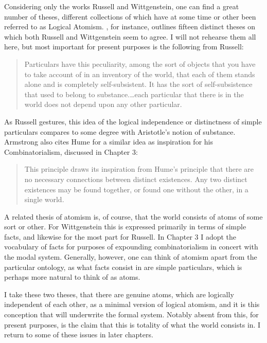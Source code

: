 Considering only the works Russell and Wittgenstein, one can find a great number of theses, different collections of which have at some time or other been referred to as Logical Atomism. \cite{Bradley:92}, for instance, outlines fifteen distinct theses on which both Russell and Wittgenstein seem to agree. I will not rehearse them all here, but most important for present purposes is the following from Russell:

\begin{quote}
Particulars have this peculiarity, among the sort of objects that you have to take account of in an inventory of the world, that each of them stands alone and is completely self-subsistent. It has the sort of self-subsistence that used to belong to substance.\dots each particular that there is in the world does not depend upon any other particular. \citeyear[p.202]{Russell:18}
\end{quote}

\noindent As Russell gestures, this idea of the logical independence or distinctness of simple particulars compares to some degree with Aristotle's notion of substance. Armstrong also cites Hume for a similar idea as inspiration for his Combinatorialism, discussed in Chapter 3:

\begin{quote}
This principle draws its inspiration from Hume's principle that there are no necessary connections between distinct existences. Any two distinct existences may be found together, or found one without the other, in a single world. \citeyear[p. 20]{Armstrong:89}
\end{quote}

\noindent A related thesis of atomism is, of course, that the world consists of atoms of some sort or other. For Wittgenstein this is expressed primarily in terms of simple facts, and likewise for the most part for Russell. In Chapter 3 I adopt the vocabulary of facts for purposes of expounding combinatorialism in concert with the modal system. Generally, however, one can think of atomism apart from the particular ontology, as what facts consist in are simple particulars, which is perhaps more natural to think of as atoms. 

I take these two theses, that there are genuine atoms, which are logically independent of each other, as a minimal version of logical atomism, and it is this conception that will underwrite the formal system. Notably absent from this, for present purposes, is the claim that this is totality of what the world consists in. I return to some of these issues in later chapters.

